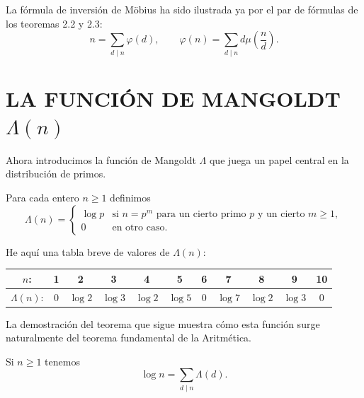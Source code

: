 \documentclass[12pt,a4paper]{book}
\begin{document}
    La fórmula de inversión de Möbius ha sido ilustrada ya por el par de fórmulas de los
    teoremas 2.2 y 2.3:
    \begin{equation*}
        n=\sum_{d\mid n}\varphi(d),\qquad \varphi(n)=\sum_{d\mid n}d\mu\left(\frac{n}{d}\right).
    \end{equation*}

    \section{LA FUNCIÓN DE MANGOLDT \texorpdfstring{$\Lambda(n)$}{Λ(n)}}

    Ahora introducimos la función de Mangoldt $\Lambda$ que juega un papel central en la
    distribución de primos.

    \begin{definicion}
        Para cada entero $n\geq1$ definimos
        \begin{equation*}
            \Lambda(n)=
            \begin{cases}
                \log p & \text{si } n=p^m \text{ para un cierto primo } p \text{ y un cierto } m\geq1,\\
                0 & \text{en otro caso.}
            \end{cases}
        \end{equation*}
    \end{definicion}

    He aquí una tabla breve de valores de $\Lambda(n)$:
    \begin{center}
        \begin{tabular}{c|cccccccccc}
            $n$: & 1 & 2 & 3 & 4 & 5 & 6 & 7 & 8 & 9 & 10\\
            \hline
            $\Lambda(n)$: & 0 & $\log2$ & $\log3$ & $\log2$ & $\log5$ & 0 & $\log7$ &
            $\log2$ & $\log3$ & 0
        \end{tabular}
    \end{center}

    La demostración del teorema que sigue muestra cómo esta función surge naturalmente del
    teorema fundamental de la Aritmética.

    \begin{teorema}
        Si $n\geq1$ tenemos
        \begin{equation}
            \log n=\sum_{d\mid n}\Lambda(d).
        \end{equation}
    \end{teorema}
\end{document}
